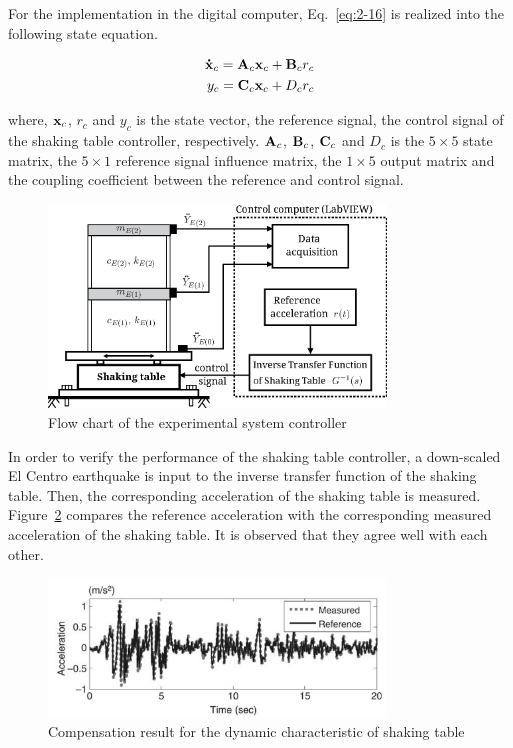 For the implementation in the digital computer, Eq.~\eqref{eq:2-16} is realized into the following state equation.

\begin{equation}\label{eq:2-17}
\begin{aligned}
\mathbf{\dot{x}}_{c} = \mathbf{A}_{c}\mathbf{x}_{c} + \mathbf{B}_{c}r_{c}\\
y_{c}=\mathbf{C}_{c}\mathbf{x}_{c}+D_{c}r_{c}
\end{aligned}
\end{equation}

where, $\mathbf{x}_{c}$, $r_{c}$ and $y_{c}$ is the state vector, the reference signal, the control signal of the shaking table controller, respectively. $\mathbf{A}_{c}$, $\mathbf{B}_{c}$, $\mathbf{C}_{c}$ and $D_{c}$ is the $5\times5$ state matrix, the $5\times1$ reference signal influence matrix, the $1\times5$ output matrix and the coupling coefficient between the reference and control signal.

\begin{figure}[ht]
\centering
\includegraphics[width=0.8\textwidth] {figure/2-8.eps}
\caption{Flow chart of the experimental system controller}
\label{fig:2-8}
\end{figure}

In order to verify the performance of the shaking table controller, a down-scaled El Centro earthquake is input to the inverse transfer function of the shaking table. Then, the corresponding acceleration of the shaking table is measured. Figure~\ref{fig:2-9} compares the reference acceleration with the corresponding measured acceleration of the shaking table. It is observed that they agree well with each other.

\begin{figure}[ht]
\centering
\includegraphics[width=0.8\textwidth] {figure/2-9.png}
\caption{Compensation result for the dynamic characteristic of shaking table}
\label{fig:2-9}
\end{figure}






